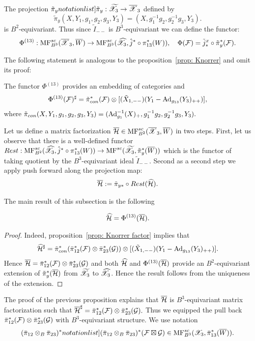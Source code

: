 The projection $\SymbolPrint{\tilde{\pi}_y}: \widetilde{\calX}_3\to \calXr_3$ defined by $$\tilde{\pi}_y(X,Y_1,g_1,g_2,g_3,Y_3)=(X,g_1^{-1}g_2,g_2^{-1}g_3,Y_3).$$
is $B^2$-equivariant. Thus since $\tilde{I}_{--}$ is $B^3$-equivariant we can define the functor:
$$ \Phi^{(13)}: \mathrm{MF}^{sc}_{B^3}(\overline{\mathscr{X}}_3,\overline{W})\to  \mathrm{MF}^{sc}_{B^3}(\widehat{\mathscr{X}}_3,\hat{j}^*\circ\pi^*_{13}(W)),\quad \Phi(\mathcal{F})=\tilde{j}^x_*\circ\tilde{\pi}_y^*(\mathcal{F}).$$

The following statement is analogous to the proposition~\ref{prop: Knorrer} and omit its proof:

\begin{proposition} The functor $\Phi^{(13)}$ provides an embedding of categories and
$$\Phi^{(13)}(\mathcal{F})^\sharp=\tilde{\pi}_{con}^*(\mathcal{F})\otimes [(\tilde{X}_{1,--}) (Y_1-{\rm Ad}_{g_{13}}(Y_3)_{++})],$$
where $\tilde{\pi}_{con}(X,Y_1,g_1,g_2,g_3,Y_3)=({\rm Ad}_{g_1}^{-1}(X)_+,g_1^{-1}g_2,g_2^{-1}g_3,Y_3).$
\end{proposition}

Let us define a matrix factorization $\overline{\mathcal{H}}\in \mathrm{MF}^{sc}_{B^2}(\overline{\mathscr{X}}_3,\overline{W})$ in two steps. First, let us observe that there is
a well-defined functor $Rest: \mathrm{MF}^{sc}_{B^2}(\widehat{\mathscr{X}}_3,\hat{j}^*\circ\pi_{13}^*(W))\to \mathrm{MF}^{sc}(\widetilde{\mathscr{X}}_3,\tilde{\pi}_y^*(\overline{W}))$
which is the functor of taking quotient by the $B^3$-equivariant  ideal $\tilde{I}_{--}$. Second as a second step we apply
push forward along the projection map:
$$ \overline{\mathcal{H}}:=\tilde{\pi}_{y*}\circ Rest(\widehat{\mathcal{H}}).$$

The main result of this subsection is the following
\begin{proposition}
$$\widehat{\mathcal{H}}=\Phi^{(13)}(\overline{\mathcal{H}}).$$
\end{proposition}
\begin{proof}
Indeed, proposition~\ref{prop: Knorrer factor} implies that
$$\widehat{\mathcal{H}}^\sharp=\tilde{\pi}^*_{con}( \bar{\pi}_{12}^*(\mathcal{F})\otimes \bar{\pi}_{23}^*(\mathcal{G}))\otimes [(\tilde{X}_{1,--}) (Y_1-{\rm Ad}_{g_{13}}(Y_3)_{++})].$$
Hence $\overline{\mathcal{H}}=\bar{\pi}_{12}^*(\mathcal{F})\otimes \bar{\pi}_{23}^*(\mathcal{G})$ and both
$\widehat{\mathcal{H}}$ and $\Phi^{(13)}(\overline{\mathcal{H}})$ provide an $B^2$-equivariant extension of $\tilde{\pi}_y^*(\overline{\mathcal{H}})$ from $\widetilde{\mathscr{X}}_3$ to
$\widehat{\mathscr{X}}_3$. Hence the result follows from the uniqueness of the extension.
\end{proof}

The proof of the previous proposition explains that $\overline{\mathcal{H}}$ is $B^3$-equivariant matrix factorization such that
$\overline{\mathcal{H}}^\sharp=\bar{\pi}_{12}^*(\mathcal{F})\otimes\bar{\pi}_{23}^*(\mathcal{G}).$ Thus we equipped the pull back
$\bar{\pi}_{12}^*(\mathcal{F})\otimes\bar{\pi}_{23}^*(\mathcal{G})$ with $B^3$-equivariant structure. We use notation
$$\SymbolPrint{(\bar{\pi}_{12}\otimes_B\bar{\pi}_{23})^*}(\calF\boxtimes\calG)\in \MF_{B^3}(\calX_3,\bar{\pi}_{13}^*(\Wr)).$$

